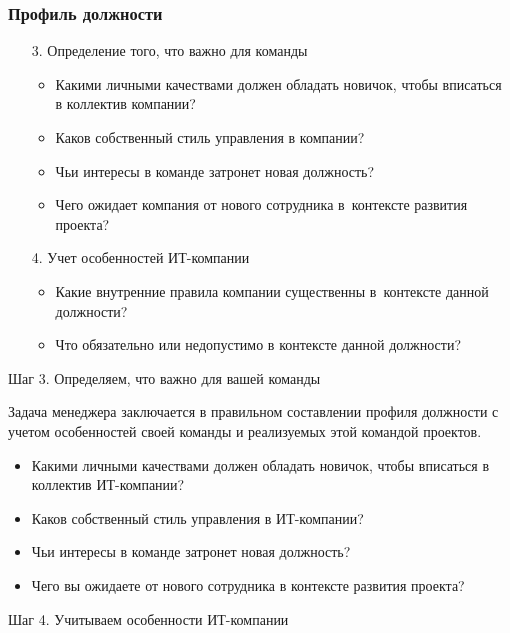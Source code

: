 \documentclass{../industrial-development}
\begin{document}
	\begin{frame} \frametitle{Профиль должности}
		\begin{itemize}
			\item[3.] Определение того, что важно для команды
			\begin{itemize}
				\item Какими личными качествами должен обладать новичок, чтобы вписаться в коллектив компании?
				\item Каков собственный стиль управления в компании?
				\item Чьи интересы в команде затронет новая должность?
				\item	Чего ожидает компания от нового сотрудника в~контексте развития проекта?
				
			\end{itemize}
			
			\item[4.] Учет особенностей ИТ-компании
			\begin{itemize}
				\item Какие внутренние правила компании существенны в~контексте данной должности?
				\item Что обязательно или недопустимо в контексте данной должности?
			\end{itemize}
		\end{itemize}
	\end{frame}
	
	\lecturenotes
	
	\alert{Шаг 3. Определяем, что важно для вашей команды}
	
	Задача менеджера заключается в правильном составлении профиля должности с учетом особенностей своей команды и реализуемых этой командой проектов.
	\begin{itemize}
		\item	Какими личными качествами должен обладать новичок, чтобы вписаться в коллектив ИТ-компании?
		\item	Каков собственный стиль управления в ИТ-компании?
		\item	Чьи интересы в команде затронет новая должность?
		\item	Чего вы ожидаете от нового сотрудника в контексте развития проекта?
	\end{itemize}
	
	\alert{Шаг 4. Учитываем особенности ИТ-компании}
	
\end{document}
